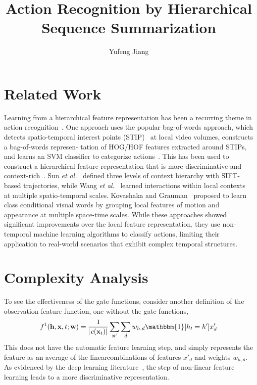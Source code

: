 \documentclass[10pt,twocolumn,letterpaper]{article}
\begin{document}
\title{Action Recognition by Hierarchical Sequence Summarization}
\author{Yufeng Jiang}
\maketitle

\section{Related Work}

Learning from a hierarchical feature representation has been a recurring theme in action recognition~\cite{model,spatio,hierarchy}. One approach uses the popular bag-of-words approach, which detects spatio-temporal interest points (STIP)~\cite{On} at local video volumes, constructs a bag-of-words represen- tation of HOG/HOF features extracted around STIPs, and learns an SVM classifier to categorize actions~\cite{realistic}. This has been used to construct a hierarchical feature representation that is more discriminative and context-rich~\cite{spatio,hierarchy}. Sun \emph{et al.}~\cite{spatio} defined three levels of context hierarchy with SIFT-based trajectories, while Wang \emph{et al.}~\cite{recognition} learned interactions within local contexts at multiple spatio-temporal scales. Kovashaka and Grauman~\cite{hierarchy} proposed to learn class conditional visual words by grouping local features of motion and appearance at multiple space-time scales. While these approaches showed significant improvements over the local feature representation, they use non-temporal machine learning algorithms to classify actions, limiting their application to real-world scenarios that exhibit complex temporal structures.

\section{Complexity Analysis}

To see the effectiveness of the gate functions, consider another definition of the observation feature function, one without the gate functions,\\
\begin{gather}
f^1(\mathbf{h},\mathbf{x},t;\mathbf{w}) = \frac{1}{|c(\mathbf{x}_t)|}\sum_{\mathbf{x'}}\sum_{d}w_{h,d}\mathbbm{1}[h_t = h']x'_d
\end{gather}
This does not have the automatic feature learning step, and simply represents the feature as an average of the linearcombinations of features $x'_d$ and weights $w_{h,d}$. As evidenced by the deep learning literature~\cite{Learning}, the step of non-linear feature learning leads to a more discriminative representation.
\end{document}
